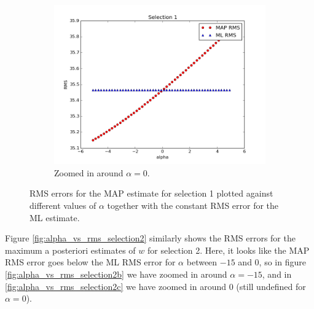 \documentclass[a4paper]{article}
\begin{document}
\begin{figure}[H]
\begin{adjustwidth}{-7em}{-7em}
    \begin{subfigure}{.32\linewidth}
      \includegraphics[width=\linewidth]{figures/alpha_vs_rms_selection1c.png}
      \caption{Zoomed in around $\alpha = 0$.}
      \label{fig:alpha_vs_rms_selection1c}
    \end{subfigure}
  \end{adjustwidth}
  \caption{RMS errors for the MAP estimate for selection 1 plotted against different values of $\alpha$ together with the constant RMS error for the ML estimate.}
  \label{fig:alpha_vs_rms_selection1}
\end{figure}

Figure \ref{fig:alpha_vs_rms_selection2} similarly shows the RMS errors for the maximum a posteriori estimates of $w$ for selection 2. Here, it looks like the MAP RMS error goes below the ML RMS error for $\alpha$ between $-15$ and $0$, so in figure \ref{fig:alpha_vs_rms_selection2b} we have zoomed in around $\alpha = -15$, and in \ref{fig:alpha_vs_rms_selection2c} we have zoomed in around 0 (still undefined for $\alpha = 0$).
\end{document}
